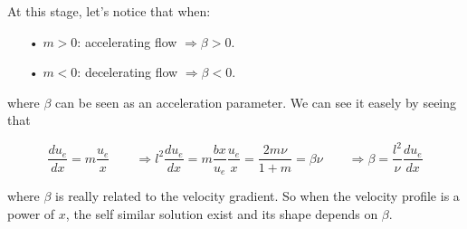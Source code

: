 			At this stage, let's notice that when: 
			\begin{itemize}
				\item[•] $m>0$: accelerating flow $\Rightarrow \beta > 0$.
				\item[•] $m<0$: decelerating flow $\Rightarrow \beta < 0$.
			\end{itemize}
			
			where $\beta$ can be seen as an acceleration parameter. We can see it easely by seeing that 
			
			\begin{equation}
				\frac{du_e}{dx} = m\frac{u_e}{x} \qquad \Rightarrow l^2 \frac{du_e}{dx} = m \frac{bx}{u_e}\frac{u_e}{x} = \frac{2 m\nu}{1+m} = \beta \nu \qquad \Rightarrow \beta = \frac{l^2}{\nu} \frac{du_e}{dx}
			\end{equation}
			
			where $\beta$ is really related to the velocity gradient. So when the velocity profile is a power of $x$, the self similar solution exist and its shape depends on $\beta$. 
			
